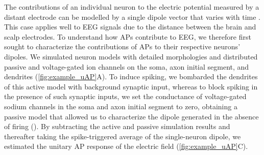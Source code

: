 The contributions of an individual neuron to the electric potential measured by a distant electrode can be modelled by a single dipole vector that varies with time \cite{Næss2021, Murakami2006}. This case applies well to EEG signals due to the distance between the brain and scalp electrodes. To understand how APs contribute to EEG, we therefore first sought to characterize the contributions of APs to their respective neurons' dipoles. We simulated neuron models with detailed morphologies and distributed passive and voltage-gated ion channels on the soma, axon initial segment, and dendrites ({\autoref{fig:example_uAP}A}). To induce spiking, we bombarded the dendrites of this active model with background synaptic input, whereas to block spiking in the presence of such synaptic inputs, we set the conductance of voltage-gated sodium channels in the soma and axon initial segment to zero, obtaining a passive model that allowed us to characterize the dipole generated in the absence of firing ({}). By subtracting the active and passive simulation results and thereafter taking the spike-triggered average of the single-neuron dipole, we estimated the unitary AP response of the electric field ({\autoref{fig:example_uAP}C}).

